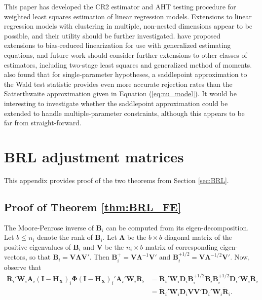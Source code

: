 \documentclass[12pt]{article}\usepackage[]{graphicx}\usepackage[]{color}
\newcommand{\bm}{\mathbf}
\newcommand{\bs}{\boldsymbol}
\begin{document}
This paper has developed the CR2 estimator and AHT testing procedure for weighted least squares estimation of linear regression models. 
Extensions to linear regression models with clustering in multiple, non-nested dimensions \citep[cf.][]{Cameron2011robust} appear to be possible, and their utility should be further investigated. 
\citet{McCaffrey2006improved} have proposed extensions to bias-reduced linearization for use with generalized estimating equations, and future work should consider further extensions to other classes of estimators, including two-stage least squares and generalized method of moments. 
\citet{McCaffrey2006improved} also found that for single-parameter hypotheses, a saddlepoint approximation to the Wald test statistic provides even more accurate rejection rates than the Satterthwaite approximation given in Equation (\ref{eq:nu_model}). 
It would be interesting to investigate whether the saddlepoint approximation could be extended to handle multiple-parameter constraints, although this appears to be far from straight-forward. 



\appendix

\section{BRL adjustment matrices}
\label{app:theorems}

This appendix provides proof of the two theorems from Section \ref{sec:BRL}. 

\subsection{Proof of Theorem \ref{thm:BRL_FE}}

The Moore-Penrose inverse of $\bm{B}_i$ can be computed from its eigen-decomposition. Let $b \leq n_i$ denote the rank of $\bm{B}_i$. 
Let $\bs\Lambda$ be the $b \times b$ diagonal matrix of the positive eigenvalues of $\bm{B}_i$ and $\bm{V}$ be the $n_i \times b$ matrix of corresponding eigen-vectors, so that $\bm{B}_i = \bm{V}\bs\Lambda\bm{V}'$. 
Then $\bm{B}_i^+ = \bm{V}\bs\Lambda^{-1}\bm{V}'$ and $\bm{B}_i^{+1/2} = \bm{V}\bs\Lambda^{-1/2}\bm{V}'$. Now, observe that 
\begin{align}
\label{eq:step1}
\bm{\ddot{R}}_i' \bm{W}_i \bm{A}_i \left(\bm{I} - \bm{H_X}\right)_i \bs\Phi \left(\bm{I} - \bm{H_X}\right)_i' \bm{A}_i' \bm{W}_i \bm{\ddot{R}}_i &= \bm{\ddot{R}}_i' \bm{W}_i \bm{D}_i \bm{B}_i^{+1/2} \bm{B}_i \bm{B}_i^{+1/2} \bm{D}_i' \bm{W}_i \bm{\ddot{R}}_i \nonumber \\
&= \bm{\ddot{R}}_i' \bm{W}_i \bm{D}_i \bm{V}\bm{V}' \bm{D}_i' \bm{W}_i \bm{\ddot{R}}_i. 
\end{align}
\end{document}
